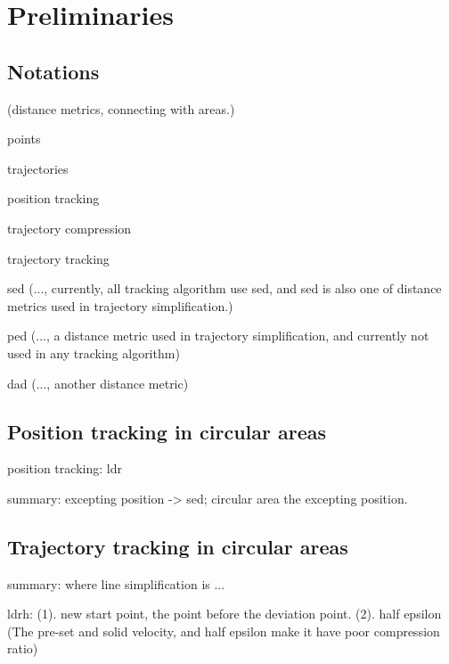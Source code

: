 



\section{Preliminaries}
\label{sec-pre}

\subsection{Notations}
(distance metrics, connecting with areas.)

points

trajectories

position tracking

trajectory compression

trajectory tracking


sed (..., currently, all tracking algorithm use sed, and sed is also one of distance metrics used in trajectory simplification.)

ped (..., a distance metric used in trajectory simplification, and currently not used in any tracking algorithm)

dad (..., another distance metric)


\subsection{Position tracking in circular areas}

position tracking: ldr

summary: excepting position -> sed; circular area the excepting position.

\subsection{Trajectory tracking in circular areas}
summary: 
where line simplification is ...

ldrh: (1). new start point, the point before the deviation point. (2). half epsilon
(The pre-set and solid velocity, and half epsilon make it have poor compression ratio)





